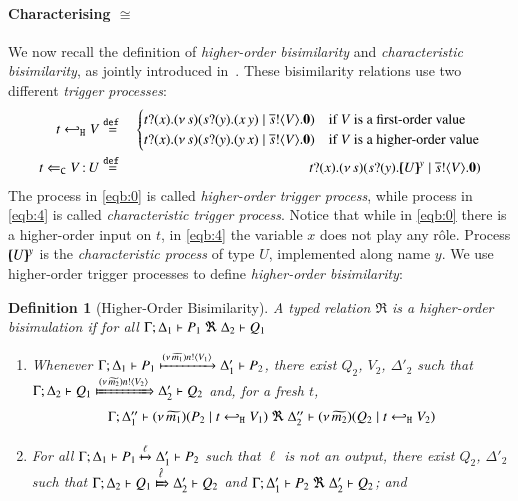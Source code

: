 \documentclass[preprint,11pt]{elsarticle}
\newtheorem{definition}{Definition}[section]
\begin{document}
{{\paragraph{Characterising $\cong$}
We now recall the definition of \emph{higher-order bisimilarity} and 
\emph{characteristic bisimilarity}, as jointly introduced in~\cite{KouzapasPY17}.
These bisimilarity relations
use two different \emph{trigger processes}:
%
\begin{eqnarray}
	t \hookleftarrow_{\mathtt{H}} V	& \stackrel{\mathtt{def}\ }{=} &
	\begin{cases}
		t ? (x) . (\nu\, s)(s ? (y) . (x\, {y}) \;|\; \overline{s} ! \langle V \rangle . \mathbf{0}) & {\text{if $V$ is a first-order value}}\\
		t ? (x) . (\nu\, s)(s ? (y) . (y\, {x}) \;|\; \overline{s} ! \langle V \rangle . \mathbf{0}) & \text{if $V$ is a higher-order value}
		\end{cases}
	\label{eqb:0} \\
	t \Leftarrow_{\mathtt{C}} V{\,:\,}U	& \stackrel{\mathtt{def}\ }{=} &	t ? (x) . (\nu\, s)(s ? (y) . [\!\!(U)\!\!]^{y} \;|\; \overline{s} ! \langle V \rangle . \mathbf{0})	
	\label{eqb:4}
\end{eqnarray}
%
The process in \eqref{eqb:0} is called \emph{higher-order trigger process},
while process in \eqref{eqb:4} is called \emph{characteristic trigger process}.
Notice that while 
in \eqref{eqb:0} there is a higher-order input on $t$, 
in \eqref{eqb:4} the variable $x$ does not play any r\^{o}le.
Process $[\!\!(U)\!\!]^{y}$ is the \emph{characteristic process} of type $U$, implemented along name $y$.
We use higher-order trigger processes to define \emph{higher-order bisimilarity}:

\begin{definition}[Higher-Order Bisimilarity]
	\label{d:hbw}
	A typed relation $\Re$ is a {\em  higher-order bisimulation} if 
	for all $\horel{\Gamma}{\Delta_1}{P_1}{\ \Re \ }{\Delta_2}{Q_1}$ 
%
	\begin{enumerate}[1)]
		\item 
				Whenever 
				$\Gamma; \Delta_1 \vdash P_1 \xmapsto{(\nu\, \widetilde{m_1}) n !\langle V_1 \rangle} \Delta_1' \vdash P_2$, there exist 
				$Q_2$, $V_2$, $\Delta'_2$ such that 
				$\horel{\Gamma}{\Delta_2}{Q_1}{\Hby{\news{\widetilde{m_2}} \bactout{n}{V_2}}}{\Delta_2'}{Q_2}$ and, for a fresh $t$, 
				\[
					\begin{array}{lrlll}
						\Gamma; \Delta''_1  \proves  {\newsp{\widetilde{m_1}}{P_2 \Par \htrigger{t}{V_1}}}
						\ \Re\ 
						\Delta''_2 \proves {\newsp{\widetilde{m_2}}{Q_2 \Par \htrigger{t}{V_2}}}
					\end{array}
				\]
		\item	
				For all $\Gamma; \Delta_1 \vdash P_1 \xmapsto{\ell} \Delta_1' \vdash P_2$ such that 
				$\ell$ is not an output, 
				there exist $Q_2$, $\Delta'_2$ such that 
				$\horel{\Gamma}{\Delta_2}{Q_1}{\Hby{\hat{\ell}}}{\Delta_2'}{Q_2}$
				and
				$\horel{\Gamma}{\Delta_1'}{P_2}{\ \Re \ }{\Delta_2'}{Q_2}$; and 


\end{enumerate}
\end{definition}}}
\end{document}
